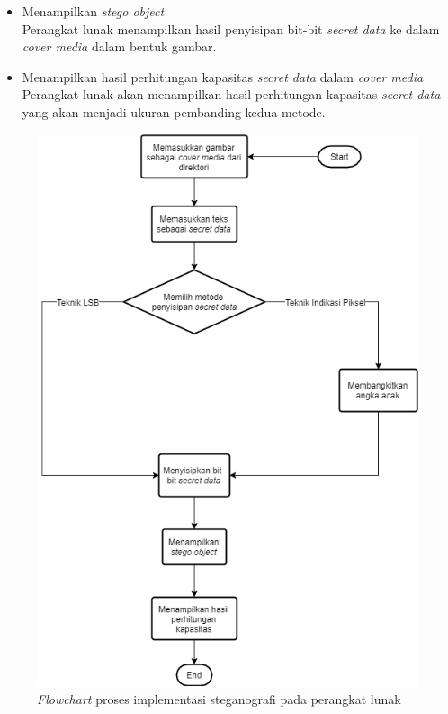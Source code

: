 \documentclass[a4paper,twoside]{article}
\begin{document}
\begin{enumerate}
\begin{itemize}
		\item Menampilkan \textit{stego object}\\
		Perangkat lunak menampilkan hasil penyisipan bit-bit \textit{secret data} ke dalam \textit{cover media} dalam bentuk gambar.
		\item Menampilkan hasil perhitungan kapasitas \textit{secret data} dalam \textit{cover media}
		Perangkat lunak akan menampilkan hasil perhitungan kapasitas \textit{secret data} yang akan menjadi ukuran pembanding kedua metode.
		\end{itemize}			
			
		\begin{figure}[!htbp]
		\centering
		\includegraphics[scale=0.5]{Construct.png}
		\caption{\textit{Flowchart} proses implementasi steganografi pada perangkat lunak}
		\label{imageCons}
		\end{figure}		
		

\end{enumerate}
\end{document}

